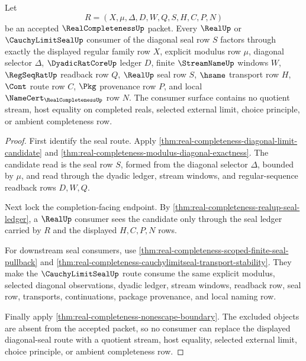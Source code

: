 \begin{theorem}
\label{thm:real-completeness-diagonal-seal-totality}
Let
$$
R=(X,\mu,\Delta,D,W,Q,S,H,C,P,N)
$$
be an accepted $\RealCompletenessUp$ packet. Every $\RealUp$ or $\CauchyLimitSealUp$ consumer of the diagonal seal row $S$ factors through exactly the displayed regular family row $X$, explicit modulus row $\mu$, diagonal selector $\Delta$, $\DyadicRatCoreUp$ ledger $D$, finite $\StreamNameUp$ windows $W$, $\RegSeqRatUp$ readback row $Q$, $\RealUp$ seal row $S$, $\hsame$ transport row $H$, $\Cont$ route row $C$, $\Pkg$ provenance row $P$, and local $\NameCert_{\RealCompletenessUp}$ row $N$. The consumer surface contains no quotient stream, host equality on completed reals, selected external limit, choice principle, or ambient completeness row.
\end{theorem}
\begin{proof}
First identify the seal route. Apply \autoref{thm:real-completeness-diagonal-limit-candidate} and \autoref{thm:real-completeness-modulus-diagonal-exactness}. The candidate read is the seal row $S$, formed from the diagonal selector $\Delta$, bounded by $\mu$, and read through the dyadic ledger, stream windows, and regular-sequence readback rows $D,W,Q$.

Next lock the completion-facing endpoint. By \autoref{thm:real-completeness-realup-seal-ledger}, a $\RealUp$ consumer sees the candidate only through the seal ledger carried by $R$ and the displayed $H,C,P,N$ rows.

For downstream seal consumers, use \autoref{thm:real-completeness-scoped-finite-seal-pullback} and \autoref{thm:real-completeness-cauchylimitseal-transport-stability}. They make the $\CauchyLimitSealUp$ route consume the same explicit modulus, selected diagonal observations, dyadic ledger, stream windows, readback row, seal row, transports, continuations, package provenance, and local naming row.

Finally apply \autoref{thm:real-completeness-nonescape-boundary}. The excluded objects are absent from the accepted packet, so no consumer can replace the displayed diagonal-seal route with a quotient stream, host equality, selected external limit, choice principle, or ambient completeness row.
\end{proof}

